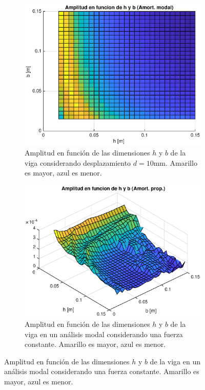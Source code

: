 \documentclass[onecolumn,10pt,titlepage,a4paper]{article}
\begin{document}
\begin{figure}[htb!]
	\centering
	\begin{subfigure}{0.47\textwidth}
		\includegraphics[width=\linewidth]{fig/amplitudVshb.eps}
		\caption{Amplitud en función de las dimensiones $h$ y $b$ de la viga considerando desplazamiento $d=10$mm. Amarillo es mayor, azul es menor.}
		\label{fig:amplitudVshb}
	\end{subfigure}
\hfill
	\begin{subfigure}{0.5\textwidth}
		\includegraphics[width=\linewidth]{fig/amplitudVshbPropRefinado.eps}
		\caption{Amplitud en función de las dimensiones $h$ y $b$ de la viga en un análisis modal considerando una fuerza constante. Amarillo es mayor, azul es menor.}
		\label{fig:amplitudVshbProp}
	\end{subfigure}
\end{figure}
\end{document}
